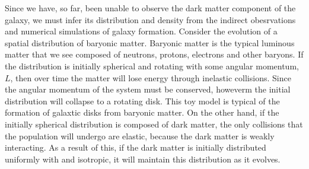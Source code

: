 Since we have, so far, been unable to observe the dark matter component of the
galaxy, we must infer its distribution and density from the indirect
obesrvations and numerical simulations of galaxy formation. Consider the
evolution of a spatial distribution of baryonic matter. Baryonic matter is the
typical luminous matter that we see composed of neutrons, protons, electrons
and other baryons. If the distribution is initially spherical and rotating
with some angular momentum, $L$, then over time the matter will lose energy
through inelastic collisions. Since the angular momentum of the system must be
conserved, howeverm the initial distribution will collapse to a rotating disk.
This toy model is typical of the formation of galaxtic disks from baryonic
matter. On the other hand, if the initially spherical distribution is composed
of dark matter, the only collisions that the population will undergo are
elastic, because the dark matter is weakly interacting. As a result of this,
if the dark matter is initially distributed uniformly with and isotropic, it
will maintain this distribution as it evolves.

